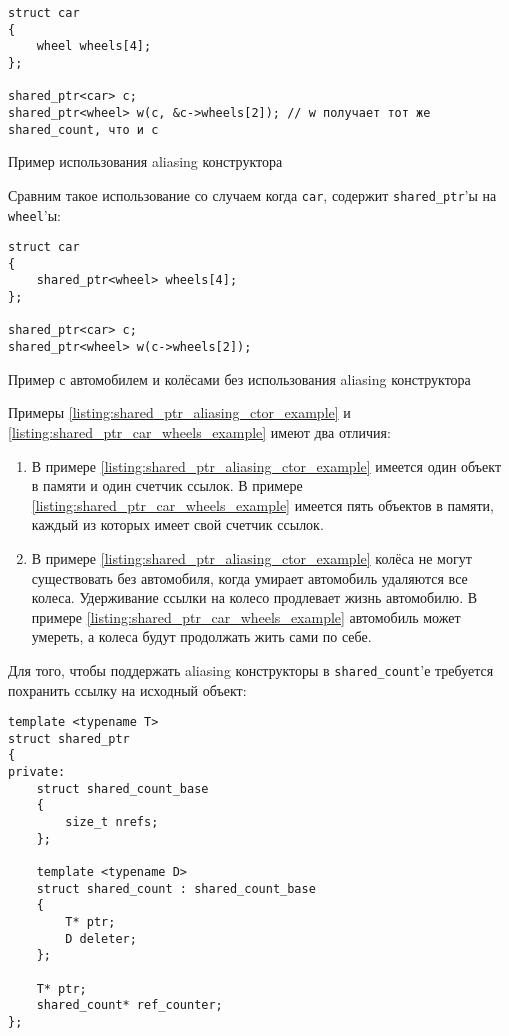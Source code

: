 \begin{listing}
\begin{verbatim}
struct car
{
    wheel wheels[4];
};

shared_ptr<car> c;
shared_ptr<wheel> w(c, &c->wheels[2]); // w получает тот же shared_count, что и c
\end{verbatim}
\caption{Пример использования aliasing конструктора}
\label{listing:shared_ptr_aliasing_ctor_example}
\end{listing}

Сравним такое использование со случаем когда \texttt{car}, содержит \texttt{shared_ptr}'ы на \texttt{wheel}'ы:

\begin{listing}
\begin{verbatim}
struct car
{
    shared_ptr<wheel> wheels[4];
};

shared_ptr<car> c;
shared_ptr<wheel> w(c->wheels[2]);
\end{verbatim}
\caption{Пример с автомобилем и колёсами без использования aliasing конструктора}
\label{listing:shared_ptr_car_wheels_example}
\end{listing}

Примеры \ref{listing:shared_ptr_aliasing_ctor_example} и \ref{listing:shared_ptr_car_wheels_example} имеют два отличия:
\begin{enumerate}
\item В примере \ref{listing:shared_ptr_aliasing_ctor_example} имеется один объект в памяти и один счетчик ссылок. В примере \ref{listing:shared_ptr_car_wheels_example} имеется пять объектов в памяти, каждый из которых имеет свой счетчик ссылок.
\item В примере \ref{listing:shared_ptr_aliasing_ctor_example} колёса не могут существовать без автомобиля, когда умирает автомобиль удаляются все колеса. Удерживание ссылки на колесо продлевает жизнь автомобилю. В примере \ref{listing:shared_ptr_car_wheels_example} автомобиль может умереть, а колеса будут продолжать жить сами по себе.
\end{enumerate}

Для того, чтобы поддержать aliasing конструкторы в \texttt{shared_count}'е требуется похранить ссылку на исходный объект:

\begin{verbatim}
template <typename T>
struct shared_ptr
{
private:
    struct shared_count_base
    {
        size_t nrefs;
    };

    template <typename D>
    struct shared_count : shared_count_base
    {
        T* ptr;
        D deleter;
    };

    T* ptr;
    shared_count* ref_counter;
};
\end{verbatim}


